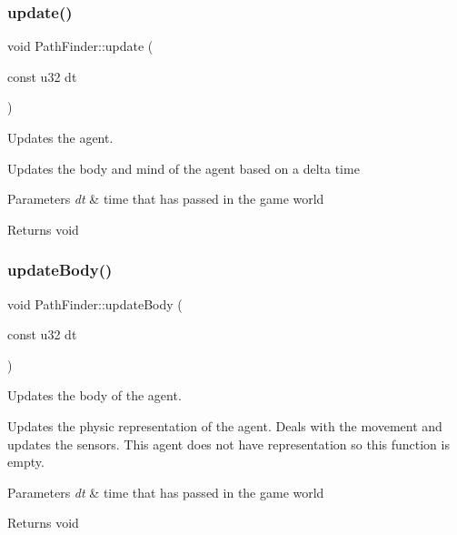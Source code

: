 \subsubsection{\texorpdfstring{update()}{update()}}
{\footnotesize\ttfamily void Path\+Finder\+::update (\begin{DoxyParamCaption}\item[{const u32}]{dt }\end{DoxyParamCaption})}



Updates the agent. 

Updates the body and mind of the agent based on a delta time


\begin{DoxyParams}{Parameters}
{\em dt} & time that has passed in the game world \\
\hline
\end{DoxyParams}
\begin{DoxyReturn}{Returns}
void 
\end{DoxyReturn}
\mbox{\label{class_path_finder_a4dc676609f38e4809f4b614b2a414235}} 
\subsubsection{\texorpdfstring{update\+Body()}{updateBody()}}
{\footnotesize\ttfamily void Path\+Finder\+::update\+Body (\begin{DoxyParamCaption}\item[{const u32}]{dt }\end{DoxyParamCaption})}



Updates the body of the agent. 

Updates the physic representation of the agent. Deals with the movement and updates the sensors. This agent does not have representation so this function is empty.


\begin{DoxyParams}{Parameters}
{\em dt} & time that has passed in the game world \\
\hline
\end{DoxyParams}
\begin{DoxyReturn}{Returns}
void 
\end{DoxyReturn}
\mbox{\label{class_path_finder_a611da8a914a8eebf13af130a6436902a}} 
